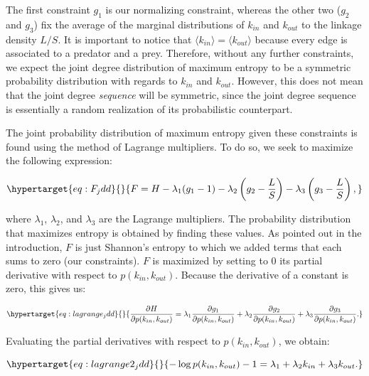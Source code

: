 \documentclass[11pt]{article}
\begin{document}
The first constraint \(g_1\) is our normalizing constraint, whereas the
other two (\(g_2\) and \(g_3\)) fix the average of the marginal
distributions of \(k_{in}\) and \(k_{out}\) to the linkage density
\(L/S\). It is important to notice that
\(\langle k_{in} \rangle = \langle k_{out} \rangle\) because every edge
is associated to a predator and a prey. Therefore, without any further
constraints, we expect the joint degree distribution of maximum entropy
to be a symmetric probability distribution with regards to \(k_{in}\)
and \(k_{out}\). However, this does not mean that the joint degree
\emph{sequence} will be symmetric, since the joint degree sequence is
essentially a random realization of its probabilistic counterpart.

The joint probability distribution of maximum entropy given these
constraints is found using the method of Lagrange multipliers. To do so,
we seek to maximize the following expression:

\begin{equation}\protect\hypertarget{eq:F_jdd}{}{F = H - \lambda_1(g_1-1)-\lambda_2\left( g_2-\frac{L}{S}\right) - \lambda_3 \left( g_3-\frac{L}{S}\right),}\label{eq:F_jdd}\end{equation}

where \(\lambda_1\), \(\lambda_2\), and \(\lambda_3\) are the Lagrange
multipliers. The probability distribution that maximizes entropy is
obtained by finding these values. As pointed out in the introduction,
\(F\) is just Shannon's entropy to which we added terms that each sums
to zero (our constraints). \(F\) is maximized by setting to 0 its
partial derivative with respect to \(p(k_{in},k_{out})\). Because the
derivative of a constant is zero, this gives us:

\begin{equation}\protect\hypertarget{eq:lagrange_jdd}{}{\frac{\partial H}{\partial p(k_{in},k_{out})} = \lambda_1 \frac{\partial g_1}{\partial p(k_{in},k_{out})} + \lambda_2 \frac{\partial g_2}{\partial p(k_{in},k_{out})}+ \lambda_3 \frac{\partial g_3}{\partial p(k_{in},k_{out})}.}\label{eq:lagrange_jdd}\end{equation}

Evaluating the partial derivatives with respect to
\(p(k_{in},k_{out})\), we obtain:

\begin{equation}\protect\hypertarget{eq:lagrange2_jdd}{}{-\log p(k_{in},k_{out}) - 1 = \lambda_1 + \lambda_2 k_{in} + \lambda_3 k_{out}.}\label{eq:lagrange2_jdd}\end{equation}
\end{document}
